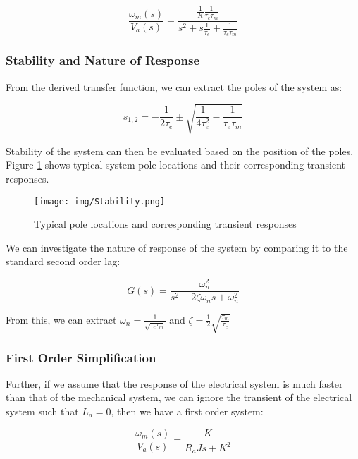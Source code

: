 \documentclass[a4paper]{article}
\begin{document}
$$
\frac{\omega_{m}(s)}{V_{a}(s)}= \frac{
                        \frac{1}{K} \frac{1}{\tau_{e} \tau_{m}}
                }{
                        s^{2} + s \frac{1}{\tau_{e}} + \frac{1}{\tau_{e} \tau_{m}}
                }  
$$

\subsubsection{Stability and Nature of Response}

From the derived transfer function, we can extract the poles of the system as:

$$
s_{1,2}= -\frac{1}{2 \tau_{e}} \pm \sqrt{\frac{1}{4 \tau_{e}^{2}} - \frac{1}{\tau_{e} \tau_{m}} }
$$

Stability of the system can then be evaluated based on the position of the poles. 
Figure \ref{fig:Stability} shows typical system pole locations and their corresponding transient responses. 

\begin{figure}
        \centering
        \texttt{[image: img/Stability.png]}
        \caption{Typical pole locations and corresponding transient responses \cite{kim17}}
        \label{fig:Stability}
\end{figure}

We can investigate the nature of response of the system by comparing it to the standard second order lag:

$$ G(s)= \frac{ \omega_{n}^{2} }{ s^{2} + 2 \zeta\omega_{n} s + \omega_{n}^{2} } $$

From this, we can extract 
$ \omega_{n}= \frac{1}{\sqrt{\tau_{e}\tau_{m}}} $ 
and $ \zeta= \frac{1}{2} \sqrt{\frac{\tau_{m}}{\tau_{e}}} $

\subsubsection{First Order Simplification}
Further, if we assume that the response of the electrical system is much faster than that of the mechanical system, 
we can ignore the transient of the electrical system such that $L_{a}= 0$, then we have a first order system:

$$
\frac{\omega_{m}(s)}{V_{a}(s)}= \frac{ K }{ R_{a} J s + K^{2} }
$$
\end{document}
